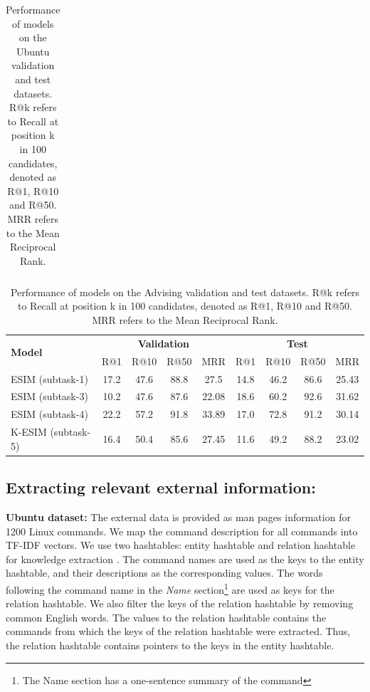 \documentclass[letterpaper]{article} %
\begin{document}
\begin{table}[htbp!]
\begin{center}
\begin{tabular}{lcccc|cccc}
\end{tabular}
\end{center}
\caption{Performance of models on the Ubuntu validation and test datasets. R@k refers to Recall at position k in 100 candidates, denoted as R@1, R@10 and R@50. MRR refers to the Mean Reciprocal Rank.}
\label{tab:baseline-results-ubuntu}
\end{table}


\begin{table}[h]
\begin{center}
\begin{tabular}{lcccc|cccc}
\hline
\multirow{2}{*}{\textbf{Model}} & \multicolumn{4}{c}{\textbf{Validation}} & \multicolumn{4}{c}{\textbf{Test}}\\
& R@1 & R@10 & R@50 & MRR & R@1 & R@10 & R@50 & MRR  \\ \hline
ESIM (subtask-1) & 17.2 & 47.6 & 88.8 & 27.5 &  14.8 & 46.2 & 86.6 & 25.43 \\ \hline
ESIM (subtask-3) & 10.2 & 47.6 & 87.6 & 22.08 &  18.6 & 60.2 & 92.6 & 31.62 \\ \hline
ESIM (subtask-4) & 22.2 & 57.2 & 91.8 & 33.89 &  17.0 & 72.8 & 91.2 & 30.14 \\ \hline
K-ESIM (subtask-5) & 16.4 & 50.4 & 85.6 & 27.45 &  11.6 & 49.2 & 88.2 & 23.02 \\ \hline
\end{tabular}
\end{center}
\caption{Performance of models on the Advising validation and test datasets. R@k refers to Recall at position k in 100 candidates, denoted as R@1, R@10 and R@50. MRR refers to the Mean Reciprocal Rank.}
\label{tab:baseline-results-advising}
\end{table}


\subsection{Extracting relevant external information:}
\textbf{Ubuntu dataset:} The external data is provided as man pages information for 1200 Linux commands.
We map the command description for all commands into TF-IDF vectors. We use two hashtables: entity hashtable and relation hashtable for knowledge extraction \cite{lowe2015incorporating}. The command names are used as the keys to the entity hashtable, and their descriptions as the corresponding values. The words following the command name in the \textit{Name} section\footnote{The Name section has a one-sentence summary of the command} are used as keys for the relation hashtable. We also filter the keys of the relation hashtable by removing common English words. The values to the relation hashtable contains the commands from which the keys of the relation hashtable were extracted. Thus, the relation hashtable contains pointers to the keys in the entity hashtable.
\end{document}
